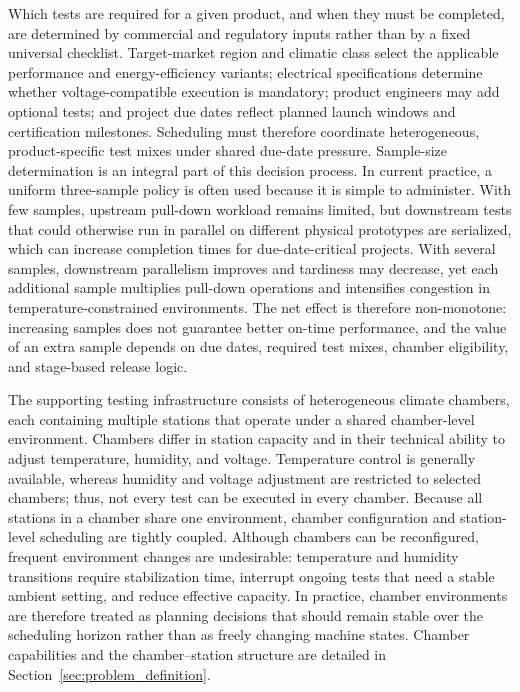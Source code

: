 \documentclass[11pt]{article}
\begin{document}
Which tests are required for a given product, and when they must be completed, are determined by commercial and regulatory inputs rather than by a fixed universal checklist. Target-market region and climatic class select the applicable performance and energy-efficiency variants; electrical specifications determine whether voltage-compatible execution is mandatory; product engineers may add optional tests; and project due dates reflect planned launch windows and certification milestones. Scheduling must therefore coordinate heterogeneous, product-specific test mixes under shared due-date pressure. Sample-size determination is an integral part of this decision process. In current practice, a uniform three-sample policy is often used because it is simple to administer. With few samples, upstream pull-down workload remains limited, but downstream tests that could otherwise run in parallel on different physical prototypes are serialized, which can increase completion times for due-date-critical projects. With several samples, downstream parallelism improves and tardiness may decrease, yet each additional sample multiplies pull-down operations and intensifies congestion in temperature-constrained environments. The net effect is therefore non-monotone: increasing samples does not guarantee better on-time performance, and the value of an extra sample depends on due dates, required test mixes, chamber eligibility, and stage-based release logic.

The supporting testing infrastructure consists of heterogeneous climate chambers, each containing multiple stations that operate under a shared chamber-level environment. Chambers differ in station capacity and in their technical ability to adjust temperature, humidity, and voltage. Temperature control is generally available, whereas humidity and voltage adjustment are restricted to selected chambers; thus, not every test can be executed in every chamber. Because all stations in a chamber share one environment, chamber configuration and station-level scheduling are tightly coupled. Although chambers can be reconfigured, frequent environment changes are undesirable: temperature and humidity transitions require stabilization time, interrupt ongoing tests that need a stable ambient setting, and reduce effective capacity. In practice, chamber environments are therefore treated as planning decisions that should remain stable over the scheduling horizon rather than as freely changing machine states. Chamber capabilities and the chamber--station structure are detailed in Section~\ref{sec:problem_definition}.
\end{document}
